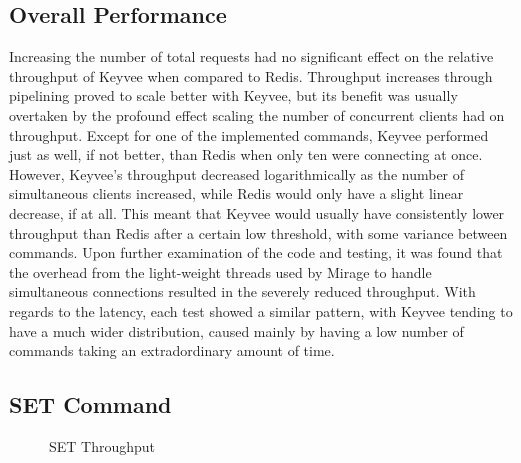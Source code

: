 \documentclass[english,10pt,twocolumn]{article}
\begin{document}
\subsection{Overall Performance}

Increasing the number of total requests had no significant effect on the relative throughput of Keyvee when compared to Redis.
Throughput increases through pipelining proved to scale better with Keyvee, but its benefit was usually overtaken by the profound effect scaling the number of concurrent clients had on throughput.
Except for one of the implemented commands, Keyvee performed just as well, if not better, than Redis when only ten were connecting at once.
However, Keyvee's throughput decreased logarithmically as the number of simultaneous clients increased, while Redis would only have a slight linear decrease, if at all.
This meant that Keyvee would usually have consistently lower throughput than Redis after a certain low threshold, with some variance between commands.
Upon further examination of the code and testing, it was found that the overhead from the light-weight threads used by Mirage to handle simultaneous connections resulted in the severely reduced throughput.
With regards to the latency, each test showed a similar pattern, with Keyvee tending to have a much wider distribution, caused mainly by having a low number of commands taking an extradordinary amount of time.

\subsection{SET Command}

\begin{figure}[!htb]
\caption{SET Throughput\label{fig:SET_T}}
\end{figure}
\end{document}
